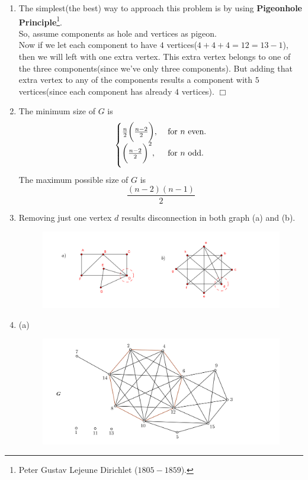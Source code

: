 \documentclass[paper=a4, fontsize=11pt,twoside]{scrartcl}		%
\theoremstyle{definition}
\theoremstyle{remark}
\begin{document}
\begin{enumerate}
\item The simplest(the best) way to approach this problem is by using \textbf{Pigeonhole Principle}\footnote{Peter Gustav Lejeune Dirichlet ($1805 - 1859$).}.\\
So, assume components as hole and vertices as pigeon.\\
Now if we let each component to have $4$ vertices($4+4+4=12=13-1$), then we will left with one extra vertex. This extra vertex belongs to one of the three components(since we've only three components). But adding that extra vertex to any of the components results a component with $5$ vertices(since each component has already $4$ vertices).
$\Box$

  \item The minimum size of $G$ is
  $$
\begin{cases}
\frac{n}{2}\biggl( \frac{n-2}{2}\biggl),&\mbox{ for }n \text{ even.}\\
\medskip
\biggl( \frac{n-2}{2}\biggl)^2,&\mbox{ for }n \text{ odd.}
\end{cases}
$$
The maximum possible size of $G$ is
$$
\frac{(n-2)(n-1)}{2}
$$
\newpage
  \item Removing just one vertex $d$ results disconnection in both graph (a) and (b).

  \begin{figure}[hbt!]
\centering
\includegraphics[width=1.0\textwidth]{SolGrapAss2.png}
\end{figure}

  \item (a)

   \begin{figure}[hbt!]
\centering
\includegraphics[width=1.0\textwidth]{SolGrapAsse13a.png}
\end{figure}


\end{enumerate}
\end{document}
